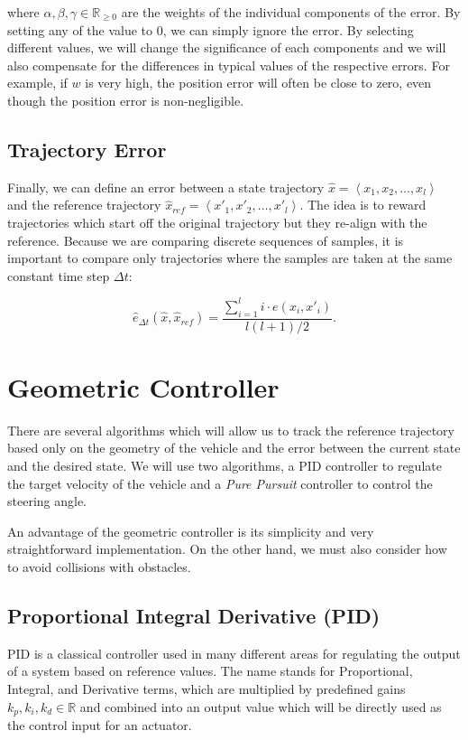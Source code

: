 where $\alpha, \beta, \gamma\in \mathbb{R}_{\geq 0}$ are the weights of the individual components of the error. By setting any of the value to $0$, we can simply ignore the error. By selecting different values, we will change the significance of each components and we will also compensate for the differences in typical values of the respective errors. For example, if $w$ is very high, the position error will often be close to zero, even though the position error is non-negligible.

\subsection{Trajectory Error}

Finally, we can define an error between a state trajectory $\hat{x}=\left\langle x_1, x_2, \ldots, x_l \right\rangle$ and the reference trajectory $\hat{x}_{ref}=\left\langle x'_1, x'_2, \ldots, x'_l \right\rangle$. The idea is to reward trajectories which start off the original trajectory but they re-align with the reference. Because we are comparing discrete sequences of samples, it is important to compare only trajectories where the samples are taken at the same constant time step $\Delta t$:

\[
	\hat{e}_{\Delta t}(\hat{x}, \hat{x}_{ref})=\dfrac{\sum_{i=1}^{l} i\cdot e(x_i, x'_i)}{l(l+1)/2}.
\]

\section{Geometric Controller}

There are several algorithms which will allow us to track the reference trajectory based only on the geometry of the vehicle and the error between the current state and the desired state. We will use two algorithms, a \gls{PID} controller to regulate the target velocity of the vehicle and a \textit{Pure Pursuit} controller to control the steering angle.

An advantage of the geometric controller is its simplicity and very straightforward implementation. On the other hand, we must also consider how to avoid collisions with obstacles.
 
\subsection{Proportional Integral Derivative (PID)}

\gls*{PID} is a classical controller used in many different areas for regulating the output of a system based on reference values. The name stands for Proportional, Integral, and Derivative terms, which are multiplied by predefined gains $k_p,k_i,k_d\in\mathbb{R}$ and combined into an output value which will be directly used as the control input for an actuator.

